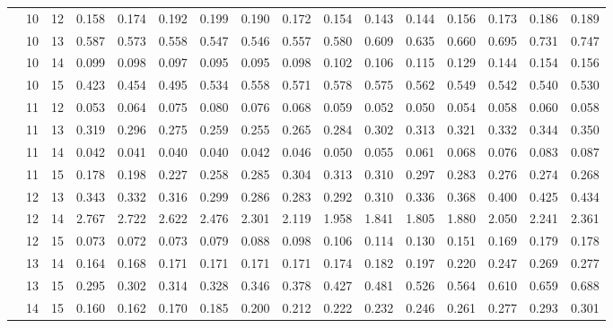 \documentclass[useAMS,usenatbib]{mn2e}
\begin{document}
\begin{longtable}{cccccccccccccccc}
 & 10 & 12 & 0.158 & 0.174 & 0.192 & 0.199 & 0.190 & 0.172 & 0.154 & 0.143 & 0.144 & 0.156 & 0.173 & 0.186 & 0.189 \\
 & 10 & 13 & 0.587 & 0.573 & 0.558 & 0.547 & 0.546 & 0.557 & 0.580 & 0.609 & 0.635 & 0.660 & 0.695 & 0.731 & 0.747 \\
 & 10 & 14 & 0.099 & 0.098 & 0.097 & 0.095 & 0.095 & 0.098 & 0.102 & 0.106 & 0.115 & 0.129 & 0.144 & 0.154 & 0.156 \\
 & 10 & 15 & 0.423 & 0.454 & 0.495 & 0.534 & 0.558 & 0.571 & 0.578 & 0.575 & 0.562 & 0.549 & 0.542 & 0.540 & 0.530 \\
 & 11 & 12 & 0.053 & 0.064 & 0.075 & 0.080 & 0.076 & 0.068 & 0.059 & 0.052 & 0.050 & 0.054 & 0.058 & 0.060 & 0.058 \\
 & 11 & 13 & 0.319 & 0.296 & 0.275 & 0.259 & 0.255 & 0.265 & 0.284 & 0.302 & 0.313 & 0.321 & 0.332 & 0.344 & 0.350 \\
 & 11 & 14 & 0.042 & 0.041 & 0.040 & 0.040 & 0.042 & 0.046 & 0.050 & 0.055 & 0.061 & 0.068 & 0.076 & 0.083 & 0.087 \\
 & 11 & 15 & 0.178 & 0.198 & 0.227 & 0.258 & 0.285 & 0.304 & 0.313 & 0.310 & 0.297 & 0.283 & 0.276 & 0.274 & 0.268 \\
 & 12 & 13 & 0.343 & 0.332 & 0.316 & 0.299 & 0.286 & 0.283 & 0.292 & 0.310 & 0.336 & 0.368 & 0.400 & 0.425 & 0.434 \\
 & 12 & 14 & 2.767 & 2.722 & 2.622 & 2.476 & 2.301 & 2.119 & 1.958 & 1.841 & 1.805 & 1.880 & 2.050 & 2.241 & 2.361 \\
 & 12 & 15 & 0.073 & 0.072 & 0.073 & 0.079 & 0.088 & 0.098 & 0.106 & 0.114 & 0.130 & 0.151 & 0.169 & 0.179 & 0.178 \\
 & 13 & 14 & 0.164 & 0.168 & 0.171 & 0.171 & 0.171 & 0.171 & 0.174 & 0.182 & 0.197 & 0.220 & 0.247 & 0.269 & 0.277 \\
 & 13 & 15 & 0.295 & 0.302 & 0.314 & 0.328 & 0.346 & 0.378 & 0.427 & 0.481 & 0.526 & 0.564 & 0.610 & 0.659 & 0.688 \\
 & 14 & 15 & 0.160 & 0.162 & 0.170 & 0.185 & 0.200 & 0.212 & 0.222 & 0.232 & 0.246 & 0.261 & 0.277 & 0.293 & 0.301 \\
\hline
\end{longtable}
\end{document}
